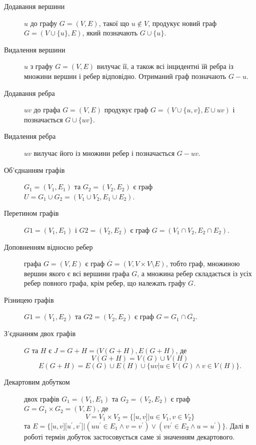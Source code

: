 \begin{description}
\item[Додавання вершини] $u$ до графу $G=(V,E)$, такої що $u \not\in V$, продукує новий граф $G=(V \cup \lbrace u \rbrace,E)$, який позначають $G \cup \lbrace u \rbrace$.
\item[Видалення вершини] $u$ з графу $G=(V,E)$ вилучає її, а також всі інцидентні їй ребра із множини вершин і ребер відповідно. Отриманий граф позначають $G-u$.
\item[Додавання ребра] $uv$ до графа $G=(V,E)$ продукує граф $G=(V \cup \lbrace u,v \rbrace, E \cup uv)$ і позначається $G \cup \lbrace uv \rbrace$.
\item[Видалення ребра] $uv$ вилучає його із множини ребер і позначається $G-uv$.
\item[Об'єднанням графів] $G_1=(V_1,E_1)$ та $G_2=(V_2,E_2)$ є граф $U=G_1 \cup G_2=(V_1 \cup V_2,E_1 \cup E_2)$.
\item[Перетином графів] $G1=(V_1,E_1)$ і $G2=(V_2,E_2)$ є граф $G=(V_1 \cap V_2, E_2 \cap E_2)$.
\item[Доповненням відносно ребер] графа $G=(V,E)$ є граф $\overline G=(V,V \times V \setminus E)$, тобто граф, множиною вершин якого є всі вершини графа $G$, а множина ребер складається із усіх ребер повного графа, крім ребер, що належать графу $G$.
\item[Різницею графів] $G1=(V_1,E_2)$ та $G2=(V_2,E_2)$ є граф $G=G_1 \cap \overline{G_2}$.
\item[З'єднанням двох графів] $G$ та $H$ є $J=G+H=(V(G+H),E(G+H)$, де $$V(G+H)=V(G) \cup V(H)$$ $$E(G+H)=E(G) \cup E(H) \cup \lbrace uv \vert u \in V(G) \land v \in V(H) \rbrace.$$
\item[Декартовим добутком] двох графів $G_1=(V_1,E_1)$ та $G_2=(V_2,E_2)$ є граф $G=G_1 \times G_2=(V,E)$, де $$V=V_1 \times V_2=\lbrace \lbrack u,v \rbrack \vert u \in V_1, v \in V_2 \rbrace$$ та $E=\lbrace \lbrack u,v \rbrack \lbrack u^\prime,v^\prime \rbrack \vert (uu^\prime \in E_1 \land v=v^\prime) \lor (vv^\prime \in E_2 \land u=u^\prime) \rbrace$. Далі в роботі термін добуток застосовується саме зі значенням декартового.
\end{description}
